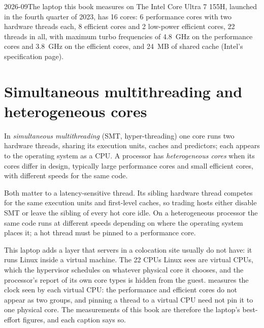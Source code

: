 \begin{dated}{2026-09}{The laptop this book measures on}\label{dat:ll:cpu-microarchitecture:laptop}
The Intel Core Ultra 7 155H, launched in the fourth quarter of 2023, has 16 cores: 6 performance cores with two
hardware threads each, 8 efficient cores and 2 low-power efficient cores, 22 threads in all, with maximum turbo
frequencies of 4.8~GHz on the performance cores and 3.8~GHz on the efficient cores, and 24~MB of shared cache (Intel's
specification page).
\end{dated}

\section{Simultaneous multithreading and heterogeneous cores}

\begin{definition}\label{def:ll:cpu-microarchitecture:smt}
In \emph{simultaneous multithreading} (SMT, hyper-threading) one core runs two
hardware threads, sharing its execution units, caches and predictors; each appears to the operating system as a CPU.
A processor has \emph{heterogeneous cores} when its cores differ in design, typically large
performance cores and small efficient cores, with different speeds for the same code.
\end{definition}

Both matter to a latency-sensitive thread. Its sibling hardware thread competes for the same execution units and
first-level caches, so trading hosts either disable SMT or leave the sibling of every hot core idle. On a
heterogeneous processor the same code runs at different speeds depending on where the operating system places it; a
hot thread must be pinned to a performance core.

This laptop adds a layer that servers in a colocation site usually do not have: it runs Linux inside a virtual
machine. The 22 CPUs Linux sees are virtual CPUs, which the hypervisor schedules on whatever physical core it chooses,
and the processor's report of its own core types is hidden from the guest. 
measures the clock seen by each virtual CPU: the performance and efficient cores do not appear as two groups, and
pinning a thread to a virtual CPU need not pin it to one physical core. The measurements of this book are therefore the laptop's
best-effort figures, and each caption says so.

